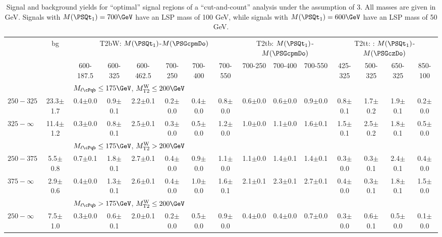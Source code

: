 \begin{table}
\begin{center}
\caption{Signal and background yields for ``optimal'' signal regions of a ``cut-and-count'' analysis under the assumption of 3\fbinv. All masses are given in GeV. Signals with $M(\PSQt_1) = 700\GeV$ have an LSP mass of 100 GeV, while signals with $M(\PSQt_1) = 600\GeV$ have an LSP mass of 50 GeV.\label{tab:sec:sigvarstudy:yields2}}
\tiny
\begin{tabular}{|l|c|cccccc|ccc|cccc|}
\hline
  & bg & \multicolumn{6}{c|}{T2bW: $M(\PSQt_1)$-$M(\PSGcpmDo)$} & \multicolumn{3}{c|}{T2tb: $M(\PSQt_1)$-$M(\PSGcpmDo)$} & \multicolumn{4}{c|}{T2tt: : $M(\PSQt_1)$-$M(\PSGczDo)$} \\
 & & 600-187.5 & 600-325 & 600-462.5 & 700-250 & 700-400 & 700-550 & 700-250 & 700-400 & 700-550 & 425-325 & 500-325 & 650-325 & 850-100 \\
\hline
 & & \multicolumn{13}{l|}{$M_{\ell \cPqb}\leq175\GeV$, $\MTtW\leq200\GeV$} \\
\hline
 $250-325$    & 23.3$\pm$1.7 & 0.4$\pm$0.0 & 0.9$\pm$0.1 & 2.2$\pm$0.1 & 0.2$\pm$0.0 & 0.4$\pm$0.0 & 0.8$\pm$0.0 & 0.6$\pm$0.0 & 0.6$\pm$0.0 & 0.9$\pm$0.0 & 0.8$\pm$0.1 & 1.7$\pm$0.2 & 1.9$\pm$0.1 & 0.2$\pm$0.0 \\
 $325-\infty$ & 11.4$\pm$1.2 & 0.3$\pm$0.0 & 0.8$\pm$0.1 & 2.5$\pm$0.1 & 0.3$\pm$0.0 & 0.5$\pm$0.0 & 1.2$\pm$0.0 & 1.0$\pm$0.0 & 1.1$\pm$0.0 & 1.6$\pm$0.1 & 1.5$\pm$0.1 & 2.5$\pm$0.2 & 1.8$\pm$0.1 & 0.5$\pm$0.0 \\
\hline
 & & \multicolumn{13}{l|}{$M_{\ell \cPqb}\leq175\GeV$, $\MTtW>200\GeV$} \\
\hline
 $250-375$    & 5.5$\pm$0.8 & 0.7$\pm$0.1 & 1.8$\pm$0.1 & 2.7$\pm$0.1 & 0.4$\pm$0.0 & 0.9$\pm$0.0 & 1.1$\pm$0.0 & 1.1$\pm$0.0 & 1.4$\pm$0.1 & 1.4$\pm$0.1 & 0.3$\pm$0.0 & 0.3$\pm$0.1 & 2.4$\pm$0.1 & 0.4$\pm$0.0 \\
 $375-\infty$ & 2.9$\pm$0.6 & 0.4$\pm$0.0 & 1.3$\pm$0.1 & 2.6$\pm$0.1 & 0.4$\pm$0.0 & 1.0$\pm$0.0 & 1.6$\pm$0.1 & 2.1$\pm$0.1 & 2.3$\pm$0.1 & 2.7$\pm$0.1 & 0.4$\pm$0.0 & 0.3$\pm$0.1 & 1.8$\pm$0.1 & 1.5$\pm$0.0 \\
\hline
 & & \multicolumn{13}{l|}{$M_{\ell \cPqb}>175\GeV$, $\MTtW\leq200\GeV$} \\
\hline
 $250-\infty$ & 7.5$\pm$1.0 & 0.3$\pm$0.0 & 0.6$\pm$0.1 & 2.0$\pm$0.1 & 0.2$\pm$0.0 & 0.5$\pm$0.0 & 0.9$\pm$0.0 & 0.4$\pm$0.0 & 0.4$\pm$0.0 & 0.7$\pm$0.0 & 0.3$\pm$0.0 & 0.6$\pm$0.1 & 0.5$\pm$0.0 & 0.1$\pm$0.0 \\

\end{tabular}
\end{center}
\end{table}
